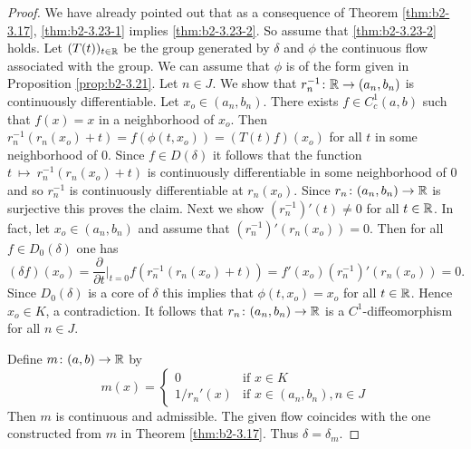\begin{proof}
We have already pointed out that as a consequence of Theorem \ref{thm:b2-3.17}, \ref{thm:b2-3.23-1} implies \ref{thm:b2-3.23-2}.
So assume that \ref{thm:b2-3.23-2} holds.
Let $(T(t))_{t \in \mathbb{R}}$ be the group generated by $\delta$ and $\phi$ the continuous flow associated with the group.
We can assume that $\phi$ is of the form given in Proposition \ref{prop:b2-3.21}.
Let $n \in J$.
We show that $r_{n}^{-1} \colon \mathbb{R} \to (a_{n},b_{n})$ is continuously differentiable.
Let $x_{o} \in (a_{n},b_{n})$.
There exists $f \in C_{c}^{1}(a,b)$ such that $f(x) = x$ in a neighborhood of $x_{o}$.
Then $r_{n}^{-1}(r_{n}(x_{o}) + t) = f(\phi(t,x_{o})) = (T(t)f)(x_{o})$ for all $t$ in some neighborhood of $0$.
Since $f \in D(\delta)$ it follows that the function $t~\mapsto~r_{n}^{-1}(r_{n}(x_{o}) + t)$ is continuously differentiable in some neighborhood of $0$ and so $r_{n}^{-1}$ is continuously differentiable at $r_{n}(x_{o})$.
Since $r_{n} \colon (a_{n},b_{n}) \to \mathbb{R}$ is surjective this proves the claim.
Next we show $(r_{n}^{-1})'(t) \neq 0$ for all $t \in \mathbb{R}$.
In fact, let $x_{o} \in (a_{n},b_{n})$ and assume that $(r_{n}^{-1})'(r_{n}(x_{o})) = 0$.
Then for all $f \in D_{0}(\delta)$ one has 
\[
(\delta f)(x_{o}) = \frac{\partial}{\partial t}|_{t=0} f(r_{n}^{-1}(r_{n}(x_{o}) + t)) = f'(x_{o})(r_{n}^{-1})'(r_{n}(x_{o})) = 0.
\]
Since $D_{0}(\delta)$ is a core of $\delta$ this implies that $\phi(t,x_{o}) = x_{o}$ for all $t \in \mathbb{R}$.
Hence $x_{o} \in K$, a contradiction.
It follows that $r_{n} \colon (a_{n},b_{n}) \to \mathbb{R}$ is a $C^{1}$-diffeomorphism for all $n \in J$.

Define $m \colon (a,b) \to \mathbb{R}$ by
\begin{equation*}\label{eq:b2-m-def}
m(x) = \begin{cases}
    0 & \text{if } x \in K \\
    1/r_{n}'(x) & \text{if } x \in (a_{n},b_{n}), n \in J
\end{cases}
\end{equation*}
Then $m$ is continuous and admissible.
The given flow coincides with the one constructed from $m$ in Theorem \ref{thm:b2-3.17}.
Thus $\delta = \delta_{m}$.
\end{proof}

